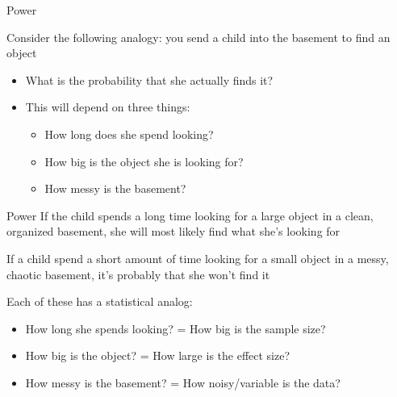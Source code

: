 \documentclass{beamer}
\begin{document}
\begin{frame}{Power}

Consider the following analogy\footnotemark: you send a child into the basement to find an object
\vspace{3mm}
\begin{itemize}
\item What is the probability that she actually finds it?
\item This will depend on three things:
	\begin{itemize}
	\item How long does she spend looking?
	\item How big is the object she is looking for?
	\item How messy is the basement?
	\end{itemize}
\end{itemize}


\end{frame}

\begin{frame}{Power}
If the child spends a long time looking for a large object in a clean, organized basement, she will most likely find what she's looking for \vspace{4mm}

If a child spend a short amount of time looking for a small object in a messy, chaotic basement, it's probably that she won't find it \vspace{4mm}

Each of these has a statistical analog:
\begin{itemize}
\item How long she spends looking? = How big is the sample size?
\item How big is the object? = How large is the effect size?
\item How messy is the basement? = How noisy/variable is the data?
\end{itemize}
\end{frame}
\end{document}

